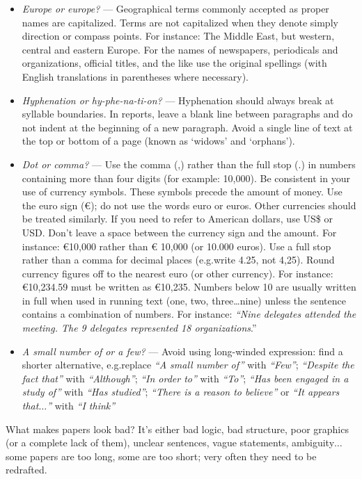 \documentclass[graybox,envcountchap,sectrefs,UStrade]{svmono}
\begin{document}
\begin{itemize}
 \item \emph{Europe or europe?} --- Geographical terms commonly accepted as proper names are capitalized. Terms are not capitalized when they denote simply direction or compass points. For instance: The Middle East, but western, central and eastern Europe. For the names of newspapers, periodicals and organizations, official titles, and the like use the original spellings (with English translations in parentheses where necessary).
 \item \emph{Hyphenation or hy-phe-na-ti-on?} --- Hyphenation should always break at syllable boundaries. In reports, leave a blank line between paragraphs and do not indent at the beginning of a new paragraph. Avoid a single line of text at the top or bottom of a page (known as `widows' and `orphans').
 \item \emph{Dot or comma?} --- Use the comma (,) rather than the full stop (.) in numbers containing more than four digits (for example: 10,000). Be consistent in your use of currency symbols. These symbols precede the amount of money. Use the euro sign ({\euro}); do not use the words euro or euros. Other currencies should be treated similarly. If you need to refer to American dollars, use US\$ or USD. Don't leave a space between the currency sign and the amount. For instance: {\euro}10,000 rather than {\euro} 10,000 (or 10.000 euros). Use a full stop rather than a comma for decimal places (e.g.\@ write 4.25, not 4,25). Round currency figures off to the nearest euro (or other currency). For instance: {\euro}10,234.59 must be written as {\euro}10,235. Numbers below 10 are usually written in full when used in running text (one, two, three\ldots  nine) unless the sentence contains a combination of numbers. For instance: \emph{``Nine delegates attended the meeting. The 9 delegates represented 18 organizations}.''
 \item \emph{A small number of or a few?} --- Avoid using long-winded expression: find a shorter alternative, e.g.\@ replace \emph{``A small number of''} with \emph{``Few''};  \emph{``Despite the fact that''} with \emph{``Although''}; \emph{``In order to''} with \emph{``To''}; \emph{``Has been engaged in a study of''} with \emph{``Has studied''}; \emph{``There is a reason to believe''} or \emph{``It appears that$\ldots$''} with \emph{``I think''}
\end{itemize}

\begin{svgraybox}
What makes papers look bad? It's either bad logic, bad structure, poor graphics (or a complete lack of them), unclear sentences, vague statements, ambiguity$\ldots$ some papers are too long, some are too short; very often they need to be redrafted.
\end{svgraybox}\label{R:success}
\end{document}
